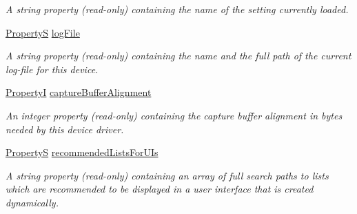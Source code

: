 \begin{DoxyCompactItemize}
\begin{DoxyCompactList}\small\item\em A string property {\bfseries }(read-\/only) containing the name of the setting currently loaded. \end{DoxyCompactList}\item 
\hypertarget{classmv_i_m_p_a_c_t_1_1acquire_1_1_info_a6a249536a84137d2d1c38a7dad33b944}{\hyperlink{classmv_i_m_p_a_c_t_1_1acquire_1_1_property_s}{Property\+S} \hyperlink{classmv_i_m_p_a_c_t_1_1acquire_1_1_info_a6a249536a84137d2d1c38a7dad33b944}{log\+File}}\label{classmv_i_m_p_a_c_t_1_1acquire_1_1_info_a6a249536a84137d2d1c38a7dad33b944}

\begin{DoxyCompactList}\small\item\em A string property {\bfseries }(read-\/only) containing the name and the full path of the current log-\/file for this device. \end{DoxyCompactList}\item 
\hypertarget{classmv_i_m_p_a_c_t_1_1acquire_1_1_info_a4d6129c09513015315b5d4d4097fcb1f}{\hyperlink{group___common_interface_ga12d5e434238ca242a1ba4c6c3ea45780}{Property\+I} \hyperlink{classmv_i_m_p_a_c_t_1_1acquire_1_1_info_a4d6129c09513015315b5d4d4097fcb1f}{capture\+Buffer\+Alignment}}\label{classmv_i_m_p_a_c_t_1_1acquire_1_1_info_a4d6129c09513015315b5d4d4097fcb1f}

\begin{DoxyCompactList}\small\item\em An integer property {\bfseries }(read-\/only) containing the capture buffer alignment in bytes needed by this device driver. \end{DoxyCompactList}\item 
\hypertarget{classmv_i_m_p_a_c_t_1_1acquire_1_1_info_a3a062316665524f116ff9a1f844714e7}{\hyperlink{classmv_i_m_p_a_c_t_1_1acquire_1_1_property_s}{Property\+S} \hyperlink{classmv_i_m_p_a_c_t_1_1acquire_1_1_info_a3a062316665524f116ff9a1f844714e7}{recommended\+Lists\+For\+U\+Is}}\label{classmv_i_m_p_a_c_t_1_1acquire_1_1_info_a3a062316665524f116ff9a1f844714e7}

\begin{DoxyCompactList}\small\item\em A string property {\bfseries }(read-\/only) containing an array of full search paths to lists which are recommended to be displayed in a user interface that is created dynamically. \end{DoxyCompactList}\end{DoxyCompactItemize}
